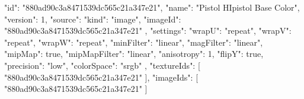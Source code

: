 {
  "id": "880ad90c3a8471539dc565c21a347e21",
  "name": "Pistol HIpistol Base Color",
  "version": 1,
  "source": {
    "kind": "image",
    "imageId": "880ad90c3a8471539dc565c21a347e21"
  },
  "settings": {
    "wrapU": "repeat",
    "wrapV": "repeat",
    "wrapW": "repeat",
    "minFilter": "linear",
    "magFilter": "linear",
    "mipMap": true,
    "mipMapFilter": "linear",
    "anisotropy": 1,
    "flipY": true,
    "precision": "low",
    "colorSpace": "srgb"
  },
  "textureIds": [
    "880ad90c3a8471539dc565c21a347e21"
  ],
  "imageIds": [
    "880ad90c3a8471539dc565c21a347e21"
  ]
}
